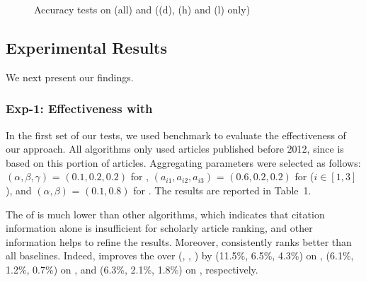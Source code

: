 \begin{figure}[tb!]
\begin{center}
\end{center}
\vspace{-5ex}
\caption{\small Accuracy tests on \fcita (all) and \recom ((d), (h) and (l) only)}
\label{fig-pairacc}
\vspace{-3ex}
\end{figure}



\subsection{Experimental Results}
\label{subsec-expres}

We next present our findings.

\subsubsection{Exp-1: Effectiveness with \recom}
In the first set of our tests, we used benchmark \recom to evaluate the effectiveness of our approach.
All algorithms only used articles published before 2012, since \recom is based on this portion of articles.
Aggregating parameters were selected as follows: $(\alpha,\beta,\gamma)$ = $(0.1, 0.2, 0.2)$ for \futurerank, $(a_{i1},a_{i2},a_{i3})$ = $(0.6, 0.2, 0.2)$ for \hhgrank ($i\in[1,3]$), and $(\alpha,\beta)$ = $(0.1, 0.8)$ for \ensemblerank.
The results are reported in Table~1.

The \PairAcc of \pagerank is much lower than other algorithms, which indicates that citation information alone is insufficient for scholarly article ranking, and other information helps to refine the results. Moreover, \ensemblerank consistently ranks better than all baselines. Indeed, \ensemblerank improves the \PairAcc over (\pagerank, \futurerank, \hhgrank) by (11.5\%, 6.5\%, 4.3\%) on \aan, (6.1\%, 1.2\%, 0.7\%) on \aminer, and (6.3\%, 2.1\%, 1.8\%) on \magdata, respectively.



